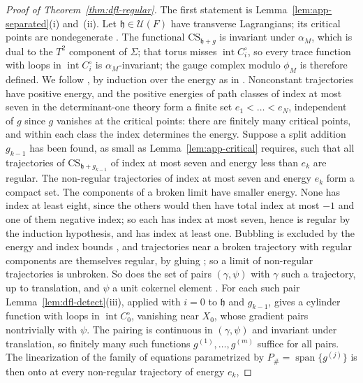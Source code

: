 \documentclass[11pt]{amsart}
\theoremstyle{definition}
\theoremstyle{remark}
\theoremstyle{plain}
\numberwithin{equation}{section}
\begin{document}
\begin{proof}[Proof of Theorem~\ref{thm:dfl-regular}]
The first statement is Lemma~\ref{lem:app-separated}(i) and~(ii). Let $\mathfrak h\in\mathcal U(F)$ have
transverse Lagrangians; its critical points are nondegenerate \cite[Lemmas~2.45
and~2.47]{DFL}. The functional $\mathrm{CS}_{\mathfrak h+g}$ is invariant under $\alpha_M$, which is dual to the $T^2$
component of $\Sigma$; that torus misses $\operatorname{int}C_i^\circ$, so every trace function with loops in
$\operatorname{int}C_i^\circ$ is $\alpha_M$-invariant; the gauge complex modulo $\phi_M$ is
therefore defined. We follow \cite[proof of Proposition~6.8]{DFL}, by induction over the energy
as in \cite[p.~145]{Donaldson-book}. Nonconstant trajectories have positive energy, and the positive energies of path classes of
index at most seven in the determinant-one theory form a finite set $e_1<\dots<e_N$,
independent of $g$ since $g$ vanishes at the critical points: there are finitely many critical
points, and within each class the index determines the energy. Suppose a split addition $g_{k-1}$ has been
found, as small as Lemma~\ref{lem:app-critical} requires, such that all trajectories of
$\mathrm{CS}_{\mathfrak h+g_{k-1}}$ of index at most seven and energy less than $e_k$ are regular.
The non-regular trajectories of index at most seven and energy $e_k$ form a compact set. The
components of a broken limit have smaller energy. None has index at least eight, since the
others would then have total index at most $-1$ and one of them negative index; so each has
index at most seven, hence is regular by the induction hypothesis, and has index at least one.
Bubbling is excluded by the energy and index bounds \cite[p.~79]{DFL}, and trajectories near a
broken trajectory with regular components are themselves regular, by gluing
\cite[p.~144]{Donaldson-book}; so a limit of non-regular trajectories is unbroken. So does the set of pairs $(\gamma,\psi)$ with $\gamma$ such a trajectory, up
to translation, and $\psi$ a unit cokernel element \cite[p.~144]{Donaldson-book}. For each such pair
Lemma~\ref{lem:dfl-detect}(iii), applied with $i=0$ to $\mathfrak h$ and $g_{k-1}$, gives a
cylinder function with loops in $\operatorname{int}C_0^\circ$, vanishing near $X_0$, whose
gradient pairs nontrivially with $\psi$. The pairing is continuous in $(\gamma,\psi)$ and
invariant under translation, so finitely many such functions $g^{(1)},\dots,g^{(m)}$ suffice for
all pairs. The linearization of the family of equations parametrized by
$P_\#=\operatorname{span}\{g^{(j)}\}$ is then onto at every non-regular trajectory of energy $e_k$,

\end{proof}
\end{document}
